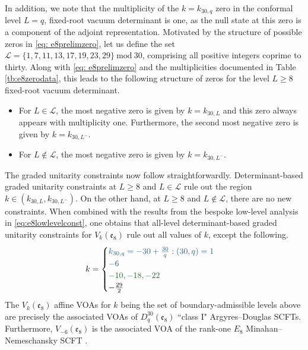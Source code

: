In addition, we note that the multiplicity of the $k = k_{30,q}$ zero in the conformal level $L = q$, fixed-root vacuum determinant is one, as the null state at this zero is a component of the adjoint representation. Motivated by the structure of possible zeros in \eqref{eq: e8prelimzero}, let us define the set $\mathcal{L} = \{1,7,11,13,17,19,23,29\}~\text{mod}~30$, comprising all positive integers coprime to thirty. Along with \eqref{eq: e8prelimzero} and the multiplicities documented in Table \ref{tb:e8zerodata}, this leads to the following structure of zeros for the level $L \geqslant 8$ fixed-root vacuum determinant.
\begin{itemize}
    \item For $L \in \mathcal{L}$, the most negative zero is given by $k = k_{30,L}$ and this zero always appears with multiplicity one. Furthermore, the second most negative zero is given by $k = k_{30,L^-}$. 
    \item For $L \notin \mathcal{L}$, the most negative zero is given by $k = k_{30, L^-}$.
\end{itemize}

The graded unitarity constraints now follow straightforwardly. Determinant-based graded unitarity constraints at $L \geqslant 8$ and $L \in \mathcal{L}$ rule out the region $k \in (k_{30, L}, k_{30, L^-})$. On the other hand, at $L \geqslant 8$ and $L \notin \mathcal{L}$, there are no new constraints. When combined with the results from the bespoke low-level analysis in \eqref{eq:e8lowlevelconst}, one obtains that all-level determinant-based graded unitarity constraints for $V_k(\mathfrak{e}_8)$ rule out all values of $k$, except the following.
\begin{equation} \label{eq:e8alllevel}
    k = \begin{cases}
        \textcolor{knownSCFTtext}{k_{30,q} = -30 + \frac{30}{q}: (30,q) = 1} \\
        \textcolor{knownSCFTtext}{-6} \\
        \textcolor{conjecturedSCFTtext}{-10, -18, -22} \\
        -\frac{29}{2}
    \end{cases}
\end{equation}
The $V_k(\mathfrak{e}_8)$ affine VOAs for  $k$ being the set of boundary-admissible levels above are precisely the associated VOAs of $D_q^{30}(\mathfrak{e}_8)$ ``class I" Argyres--Douglas SCFTs. Furthermore, $V_{-6}(\mathfrak{e}_8)$ is the associated VOA of the rank-one $E_8$ Minahan--Nemeschansky SCFT \cite{Minahan:1996cj}. 

